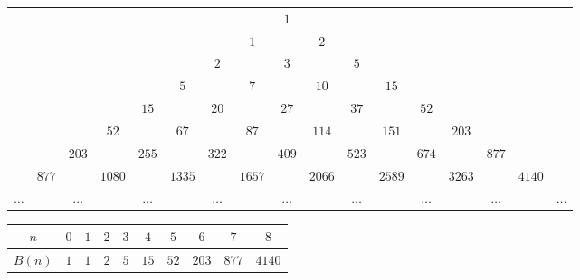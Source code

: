 \documentclass[a5paper, 11pt]{extarticle}
\theoremstyle{definition}
\theoremstyle{definition}
\theoremstyle{definition}
\numberwithin{figure}{section}
\numberwithin{table}{section}
\begin{document}
{
\renewcommand*{\arraystretch}{1.5}
\setlength{\tabcolsep}{1pt}
\begin{longtable}{ccccccccccccccccc}
               &         &            &          &            &          &            &          & \(1\)      &          &            &          &            &          &            &          &            \\
               &         &            &          &            &          &            & \(1\)    &            & \(2\)    &            &          &            &          &            &          &            \\
               &         &            &          &            &          & \(2\)      &          & \(3\)      &          & \(5\)      &          &            &          &            &          &            \\
               &         &            &          &            & \(5\)    &            & \(7\)    &            & \(10\)   &            & \(15\)   &            &          &            &          &            \\
               &         &            &          & \(15\)     &          & \(20\)     &          & \(27\)     &          & \(37\)     &          & \(52\)     &          &            &          &            \\
               &         &            & \(52\)   &            & \(67\)   &            & \(87\)   &            & \(114\)  &            & \(151\)  &            & \(203\)  &            &          &            \\
               &         & \(203\)    &          & \(255\)    &          & \(322\)    &          & \(409\)    &          & \(523\)    &          & \(674\)    &          & \(877\)    &          &            \\
               & \(877\) &            & \(1080\) &            & \(1335\) &            & \(1657\) &            & \(2066\) &            & \(2589\) &            & \(3263\) &            & \(4140\) &            \\
    \(\ldots\) &         & \(\ldots\) &          & \(\ldots\) &          & \(\ldots\) &          & \(\ldots\) &          & \(\ldots\) &          & \(\ldots\) &          & \(\ldots\) &          & \(\ldots\) \\
\end{longtable}
}

{
\renewcommand*{\arraystretch}{1.5}
\setlength{\tabcolsep}{10pt}
\begin{longtable}{|c|c|c|c|c|c|c|c|c|c|}
    \hline
    \(n\)    & \(0\) & \(1\) & \(2\) & \(3\) & \(4\)  & \(5\)  & \(6\)   & \(7\)   & \(8\)    \\
    \hline
    \(B(n)\) & \(1\) & \(1\) & \(2\) & \(5\) & \(15\) & \(52\) & \(203\) & \(877\) & \(4140\) \\
    \hline
\end{longtable}
}
\end{document}
